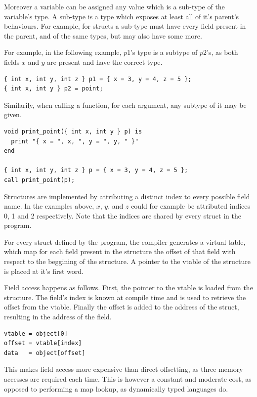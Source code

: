 \documentclass{article}
\begin{document}
Moreover a variable can be assigned any value which is a sub-type of the variable's type. A
sub-type is a type which exposes at least all of it's parent's behaviours. For example, for structs
a sub-type must have every field present in the parent, and of the same types, but may also have some more.

For example, in the following example, $p1$'s type is a subtype of $p2$'s, as both fields $x$ and
$y$ are present and have the correct type.

\begin{lstlisting}
{ int x, int y, int z } p1 = { x = 3, y = 4, z = 5 };
{ int x, int y } p2 = point;
\end{lstlisting}

Similarily, when calling a function, for each argument, any subtype of it may be given.
\begin{lstlisting}
void print_point({ int x, int y } p) is
  print "{ x = ", x, ", y = ", y, " }"
end

{ int x, int y, int z } p = { x = 3, y = 4, z = 5 };
call print_point(p);
\end{lstlisting}

Structures are implemented by attributing a distinct index to every possible field name. In the examples
above, $x$, $y$, and $z$ could for example be attributed indices 0, 1 and 2 respectively.
Note that the indices are shared by every struct in the program.

For every struct defined by the program, the compiler generates a virtual table, which map for each field
present in the structure the offset of that field with respect to the beggining of the structure.
A pointer to the vtable of the structure is placed at it's first word.

Field access happens as follows. First, the pointer to the vtable is loaded from the structure. The field's
index is known at compile time and is used to retrieve the offset from the vtable. Finally the offset is
added to the address of the struct, resulting in the address of the field.

\begin{lstlisting}
vtable = object[0]
offset = vtable[index]
data   = object[offset]
\end{lstlisting}

This makes field access more expensive than direct offsetting, as three memory accesses are required each time.
This is however a constant and moderate cost, as opposed to performing a map lookup, as dynamically typed languages do.
\end{document}
